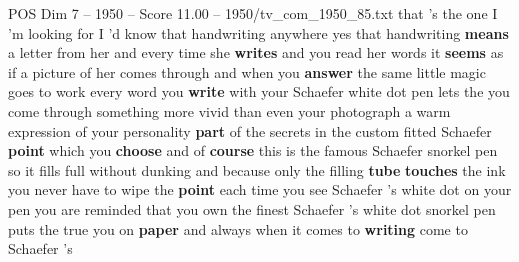 \begin{textsample}{POS Dim 7 – 1950 – Score 11.00 – 1950/tv\_com\_1950\_85.txt}  \label{ex:f7_pos_001}
that 's the one I 'm looking for I 'd know that handwriting anywhere yes that handwriting \textbf{means} a letter from her and every time she \textbf{writes} and you read her words it \textbf{seems} as if a picture of her comes through and when you \textbf{answer} the same little magic goes to work every word you \textbf{write} with your Schaefer white dot pen lets the you come through something more vivid than even your photograph a warm expression of your personality \textbf{part} of the secrets in the custom fitted Schaefer \textbf{point} which you \textbf{choose} and of \textbf{course} this is the famous Schaefer snorkel pen so it fills full without dunking and because only the filling \textbf{tube} \textbf{touches} the ink you never have to wipe the \textbf{point} each time you see Schaefer 's white dot on your pen you are reminded that you own the finest Schaefer 's white dot snorkel pen puts the true you on \textbf{paper} and always when it comes to \textbf{writing} come to Schaefer 's

\end{textsample}
